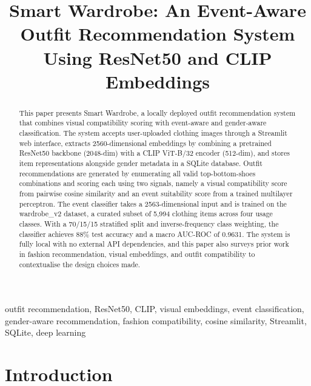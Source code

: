\documentclass[conference]{IEEEtran}
\begin{document}
\title{Smart Wardrobe: An Event-Aware Outfit Recommendation System Using ResNet50 and CLIP Embeddings}

\author{
}

\maketitle

\begin{abstract}
This paper presents Smart Wardrobe, a locally deployed outfit recommendation system that combines visual compatibility scoring with event-aware and gender-aware classification. The system accepts user-uploaded clothing images through a Streamlit web interface, extracts 2560-dimensional embeddings by combining a pretrained ResNet50 backbone (2048-dim) with a CLIP ViT-B/32 encoder (512-dim), and stores item representations alongside gender metadata in a SQLite database. Outfit recommendations are generated by enumerating all valid top-bottom-shoes combinations and scoring each using two signals, namely a visual compatibility score from pairwise cosine similarity and an event suitability score from a trained multilayer perceptron. The event classifier takes a 2563-dimensional input and is trained on the wardrobe\_v2 dataset, a curated subset of 5,994 clothing items across four usage classes. With a 70/15/15 stratified split and inverse-frequency class weighting, the classifier achieves 88\% test accuracy and a macro AUC-ROC of 0.9631. The system is fully local with no external API dependencies, and this paper also surveys prior work in fashion recommendation, visual embeddings, and outfit compatibility to contextualise the design choices made.
\end{abstract}

\begin{IEEEkeywords}
outfit recommendation, ResNet50, CLIP, visual embeddings, event classification, gender-aware recommendation, fashion compatibility, cosine similarity, Streamlit, SQLite, deep learning
\end{IEEEkeywords}

\section{Introduction}
\end{document}
